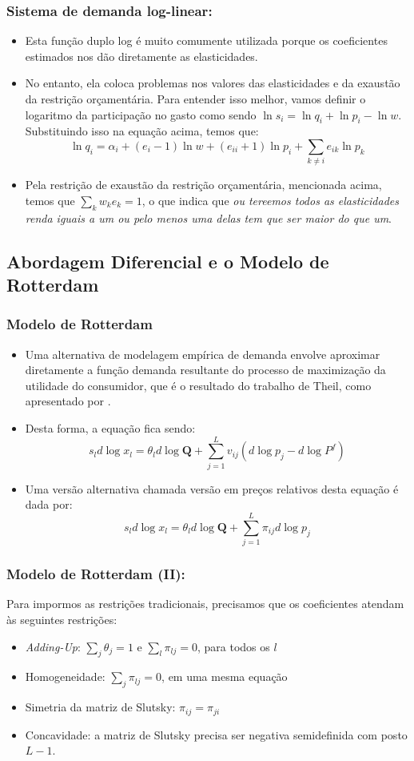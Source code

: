 \documentclass{beamer}
\begin{document}
\begin{frame}\frametitle{Sistema de demanda log-linear:}

\begin{itemize}
\item Esta função duplo log é muito comumente utilizada porque os coeficientes
estimados nos dão diretamente as elasticidades. 
\item No entanto, ela coloca problemas nos valores das elasticidades e da
exaustão da restrição orçamentária. Para entender isso melhor, vamos
definir o logaritmo da participação no gasto como sendo $\ln s_{i}=\ln q_{i}+\ln p_{i}-\ln w$.
Substituindo isso na equação acima, temos que:
\[
\ln q_{i}=\alpha_{i}+(e_{i}-1)\ln w+(e_{ii}+1)\ln p_{i}+\sum_{k\neq i}e_{ik}\ln p_{k}
\]
\item Pela restrição de exaustão da restrição orçamentária, mencionada acima,
temos que $\sum_{k}w_{k}e_{k}=1$, o que indica que \emph{ou tereemos
todos as elasticidades renda iguais a um ou pelo menos uma delas tem
que ser maior do que um}. 
\end{itemize}
\end{frame}

\subsection{Abordagem Diferencial e o Modelo de Rotterdam}
\begin{frame}\frametitle{Modelo de Rotterdam}

\begin{itemize}
\item Uma alternativa de modelagem empírica de demanda envolve aproximar diretamente a função demanda resultante do processo de maximização da utilidade do consumidor, que é o resultado do trabalho de Theil, como apresentado por \citet{Barnett2008}.
\item Desta forma, a equação fica sendo:
\[
s_{l}d\log x_{l}=\theta_{l}d\log\mathbf{Q}+\sum_{j=1}^{L}v_{ij}\left(d\log p_{j}-d\log P^{f}\right)
\]
\item Uma versão alternativa chamada versão em preços relativos desta equação é dada por:
\[
s_{l}d\log x_{l}=\theta_{l}d\log\mathbf{Q}+\sum_{j=1}^{L}\pi_{ij}d\log p_{j}
\]
\end{itemize}
\end{frame}

\begin{frame}\frametitle{Modelo de Rotterdam (II):}

Para impormos as restrições tradicionais, precisamos que os coeficientes
atendam às seguintes restrições:
\begin{itemize}
\item \emph{Adding-Up}: $\sum_{j}\theta_{j}=1$ e $\sum_{l}\pi_{lj}=0$,
para todos os $l$
\item Homogeneidade: $\sum_{j}\pi_{lj}=0$, em uma mesma equação
\item Simetria da matriz de Slutsky: $\pi_{ij}=\pi_{ji}$
\item Concavidade: a matriz de Slutsky precisa ser negativa semidefinida
com posto $L-1$.
\end{itemize}
\end{frame}
\end{document}

